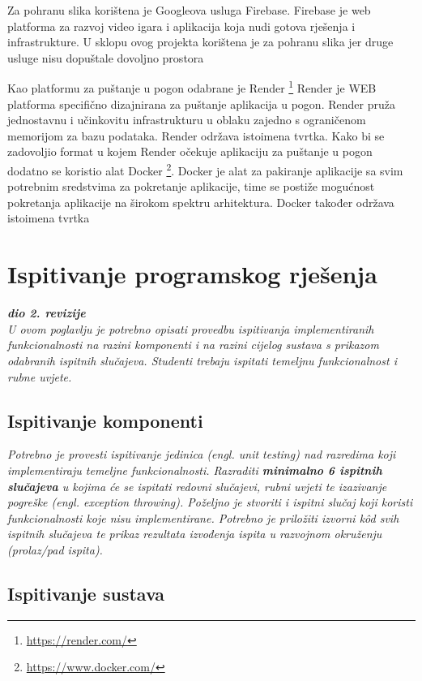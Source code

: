 			Za pohranu slika korištena je Googleova usluga Firebase. Firebase je web platforma za razvoj video igara i aplikacija koja nudi gotova rješenja i infrastrukture. U sklopu ovog projekta korištena je za pohranu slika jer druge usluge nisu dopuštale dovoljno prostora
			
			Kao platformu za puštanje u pogon odabrane je Render \footnote{\url{https://render.com/}} Render je WEB platforma specifično dizajnirana za puštanje aplikacija u pogon. Render pruža jednostavnu i učinkovitu infrastrukturu u oblaku zajedno s ograničenom memorijom za bazu podataka. Render održava istoimena tvrtka. Kako bi se zadovoljio format u kojem Render očekuje aplikaciju za puštanje u pogon dodatno se koristio alat Docker \footnote{\url{https://www.docker.com/}}. Docker je alat za pakiranje aplikacije sa svim potrebnim sredstvima za pokretanje aplikacije, time se postiže mogućnost pokretanja aplikacije na širokom spektru arhitektura. Docker također održava istoimena tvrtka
			
		
	
		\section{Ispitivanje programskog rješenja}
			
			\textbf{\textit{dio 2. revizije}}\\
			
			 \textit{U ovom poglavlju je potrebno opisati provedbu ispitivanja implementiranih funkcionalnosti na razini komponenti i na razini cijelog sustava s prikazom odabranih ispitnih slučajeva. Studenti trebaju ispitati temeljnu funkcionalnost i rubne uvjete.}
	
			
			\subsection{Ispitivanje komponenti}
			\textit{Potrebno je provesti ispitivanje jedinica (engl. unit testing) nad razredima koji implementiraju temeljne funkcionalnosti. Razraditi \textbf{minimalno 6 ispitnih slučajeva} u kojima će se ispitati redovni slučajevi, rubni uvjeti te izazivanje pogreške (engl. exception throwing). Poželjno je stvoriti i ispitni slučaj koji koristi funkcionalnosti koje nisu implementirane. Potrebno je priložiti izvorni kôd svih ispitnih slučajeva te prikaz rezultata izvođenja ispita u razvojnom okruženju (prolaz/pad ispita). }
			
			
			
			\subsection{Ispitivanje sustava}
			

